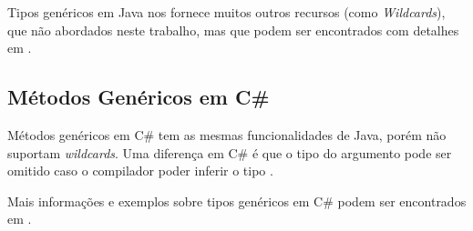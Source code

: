 Tipos genéricos em Java nos fornece muitos outros recursos (como \emph{Wildcards}), que não abordados neste trabalho, mas que podem ser encontrados com detalhes em \cite{generics_java}.

\subsection{Métodos Genéricos em C\#} %
\label{sub:metodos_genericos_em_c_sharp}
Métodos genéricos em C\# tem as mesmas funcionalidades de Java, porém não suportam \emph{wildcards}. Uma diferença em C\# é que o tipo do argumento pode ser omitido caso o compilador poder inferir o tipo \cite{sebesta}. 

Mais informações e exemplos sobre tipos genéricos em C\# podem ser encontrados em \cite{generics_msdn}.

